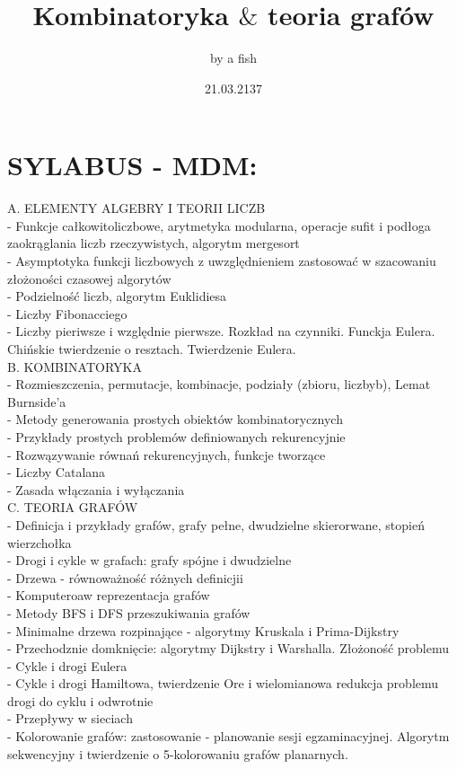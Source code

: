 \documentclass{article}
\title {Kombinatoryka $\&$ teoria grafów}
\author{by a fish}
\date {21.03.2137}
\begin{document}
\maketitle

\newpage

\section*{SYLABUS - MDM:}
\indent A. ELEMENTY ALGEBRY I TEORII LICZB\medskip\\
\indent\indent - Funkcje całkowitoliczbowe, arytmetyka modularna, operacje sufit i podłoga zaokrąglania liczb rzeczywistych, algorytm mergesort\\
\indent\indent - Asymptotyka funkcji liczbowych z uwzględnieniem zastosować w szacowaniu złożoności czasowej algorytów\\
\indent\indent - Podzielność liczb, algorytm Euklidiesa\\
\indent\indent - Liczby Fibonacciego\\
\indent\indent - Liczby pieriwsze i względnie pierwsze. Rozkład na czynniki. Funckja Eulera. Chińskie twierdzenie o resztach. Twierdzenie Eulera.\bigskip\\
\indent B. KOMBINATORYKA\medskip\\
\indent\indent - Rozmieszczenia, permutacje, kombinacje, podziały (zbioru, liczbyb), Lemat Burnside'a\\
\indent\indent - Metody generowania prostych obiektów kombinatorycznych\\
\indent\indent - Przykłady prostych problemów definiowanych rekurencyjnie\\
\indent\indent - Rozwązywanie równań rekurencyjnych, funkcje tworzące\\
\indent\indent - Liczby Catalana\\
\indent\indent - Zasada włączania i wyłączania\bigskip\\
\indent C. TEORIA GRAFÓW\medskip\\
\indent\indent - Definicja i przykłady grafów, grafy pełne, dwudzielne skierorwane, stopień wierzchołka\\
\indent\indent - Drogi i cykle w grafach: grafy spójne i dwudzielne\\
\indent\indent - Drzewa - równoważność różnych definicjii\\
\indent\indent - Komputeroaw reprezentacja grafów\\
\indent\indent - Metody BFS i DFS przeszukiwania grafów\\
\indent\indent - Minimalne drzewa rozpinające - algorytmy Kruskala i Prima-Dijkstry\\
\indent\indent - Przechodznie domknięcie: algorytmy Dijkstry i Warshalla. Złożoność problemu\\
\indent\indent - Cykle i drogi Eulera\\
\indent\indent - Cykle i drogi Hamiltowa, twierdzenie Ore i wielomianowa redukcja problemu drogi do cyklu i odwrotnie\\
\indent\indent - Przepływy w sieciach\\
\indent\indent - Kolorowanie grafów: zastosowanie - planowanie sesji egzaminacyjnej. Algorytm sekwencyjny i twierdzenie o 5-kolorowaniu grafów planarnych.
\end{document}

